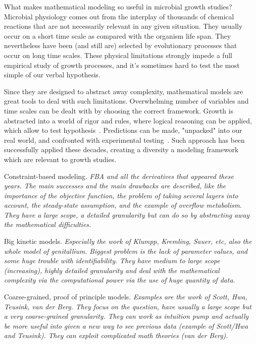 What makes mathematical modeling so useful in microbial growth studies?
Microbial physiology comes out from the interplay of thousands of chemical reactions that are not necessarily relevant in any given situation.
They usually occur on a short time scale as compared with the organism life span.
They nevertheless have been (and still are) selected by evolutionary processes that occur on long time scales.
These physical limitations strongly impede a full empirical study of growth processes, and it's sometimes hard to test the most simple of our verbal hypothesis.

Since they are designed to abstract away complexity, mathematical models are great tools to deal with such limitations.
Overwhelming number of variables and time scales can be dealt with by choosing the correct framework.
Growth is abstracted into a world of rigor and rules, where logical reasoning can be applied, which allow to test hypothesis~\cite{servedio_not_2014}.
Predictions can be made, "unpacked" into our real world, and confronted with experimental testing~\cite{mcgill_calm_2013}.
Such approach has been successfully applied these decades, creating a diversity a modeling framework which are relevant to growth studies.

Constraint-based modeling.
\textit{FBA and all the derivatives that appeared these years.
The main successes and the main drawbacks are described, like the importance of the objective function, the problem of taking several layers into account, the steady-state assumption, and the example of overflow metabolism.
They have a large scope, a detailed granularity but can do so by abstracting away the mathematical difficulties.}

Big kinetic models.
\textit{Especially the work of Klumpp, Kremling, Sauer, etc, also the whole model of genitallium.
Biggest problem is the lack of parameter values, and some huge trouble with identifiability.
They have medium to large scope (increasing), highly detailed granularity and deal with the mathematical complexity via the computational power via the use of huge quantity of data.}

Coarse-grained, proof of principle models.
\textit{Examples are the work of Scott, Hwa, Teusink, van der Berg.
They focus on the question, have usually a large scope but a very coarse-grained granularity.
They can work as intuition pump and actually be more useful into given a new way to see previous data (example of Scott/Hwa and Teusink).
They can exploit complicated math theories (van der Berg).}


